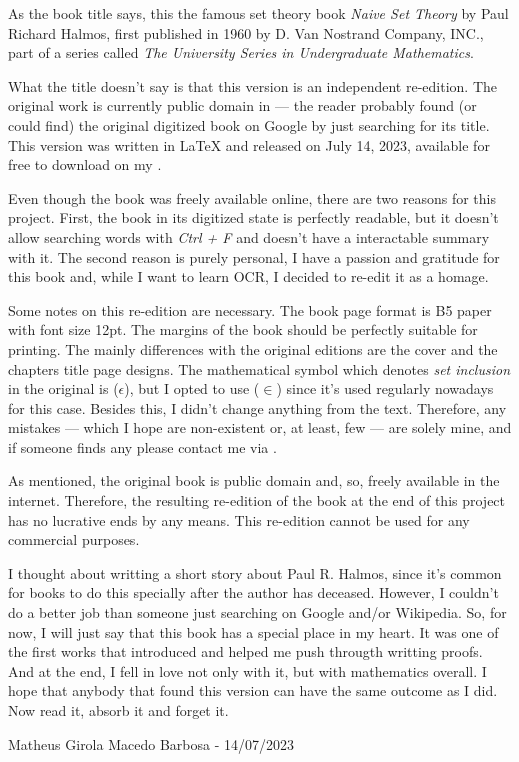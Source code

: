 As the book title says, this the famous set theory book \textit{Naive Set Theory} by Paul Richard Halmos, first published in 1960 by D. Van Nostrand Company, INC., part of a series called \textit{ The University Series in Undergraduate Mathematics}.

What the title doesn't say is that this version is an independent re-edition. The original work is currently public domain in \href{https://babel.hathitrust.org}{\color{blue}{Hathi Trust Digital Library}} — the reader probably found (or could find) the original digitized book on Google by just searching for its title. This version was written in LaTeX and released on July 14, 2023, available for free to download on my \href{https://github.com/matheusgirola/Halmos-Naive-Set-Theory-OCR-LaTeX-Reedition}{\color{blue}{Github repository}}.

Even though the book was freely available online, there are two reasons for this project. First, the book in its digitized state is perfectly readable, but it doesn't allow searching words with \textit{Ctrl + F} and doesn't have a interactable summary with it. The second reason is purely personal, I have a passion and gratitude for this book and, while I want to learn OCR, I decided to re-edit it as a homage.

Some notes on this re-edition are necessary. The book page format is B5 paper with font size 12pt. The margins of the book should be perfectly suitable for printing. The mainly differences with the original editions are the cover and the chapters title page designs. The mathematical symbol which denotes \textit{set inclusion} in the original is ($\epsilon$), but I opted to use ($\in$) since it's used regularly nowadays for this case. Besides this, I didn't change anything from the text. Therefore, any mistakes — which I hope are non-existent or, at least, few —  are solely mine, and if someone finds any please contact me via  \href{mailto:matheusgirola@gmail.com}{\color{blue}{e-mail}}.

As mentioned, the original book is public domain and, so, freely available in the internet. Therefore, the resulting re-edition of the book at the end of this project has no lucrative ends by any means. This re-edition cannot be used for any commercial purposes.

I thought about writting a short story about Paul R. Halmos, since it's common for books to do this specially after the author has deceased. However, I couldn't do a better job than someone just searching on Google and/or Wikipedia. So, for now, I will just say that this book has a special place in my heart. It was one of the first works that introduced and helped me push througth writting proofs. And at the end, I fell in love not only with it, but with mathematics overall. I hope that anybody that found this version can have the same outcome as I did. Now read it, absorb it and forget it.

\begin{flushright}
Matheus Girola Macedo Barbosa - 14/07/2023
\end{flushright}
